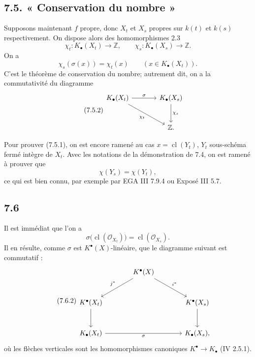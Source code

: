 \documentclass[11pt]{article}
\newcommand{\cl}{\operatorname{cl}}
\begin{document}
\subsection*{7.5. « Conservation du nombre »}
Supposons maintenant \(f\) propre, donc \(X_t\) et \(X_s\) propres sur \(k(t)\) et \(k(s)\) respectivement. On dispose alors des homomorphismes 2.3
\[
  \chi_t:K_\bullet(X_t)\longrightarrow \mathbb Z,\qquad
  \chi_s:K_\bullet(X_s)\longrightarrow \mathbb Z .
\]
On a
\begin{equation}\tag{7.5.1}
  \chi_s(\sigma(x))=\chi_t(x)\qquad (x\in K_\bullet(X_t)).
\end{equation}
C'est le théorème de conservation du nombre; autrement dit, on a la commutativité du diagramme
\begin{equation}\tag{7.5.2}
\begin{tikzcd}[column sep=large,row sep=large]
K_\bullet(X_t) \arrow[r,"\sigma"] \arrow[dr,"\chi_t"'] &
K_\bullet(X_s) \arrow[d,"\chi_s"]\\
& \mathbb Z .
\end{tikzcd}
\end{equation}

Pour prouver (7.5.1), on est encore ramené au cas \(x=\cl(Y_t)\), \(Y_t\) sous-schéma fermé intègre de \(X_t\). Avec les notations de la démonstration de 7.4, on est ramené à prouver que
\[
  \chi(Y_s)=\chi(Y_t),
\]
ce qui est bien connu, par exemple par EGA III 7.9.4 ou Exposé III 5.7.

\subsection*{7.6}
Il est immédiat que l'on a
\begin{equation}\tag{7.6.1}
  \sigma\bigl(\cl(\mathcal O_{X_t})\bigr)=\cl(\mathcal O_{X_s}).
\end{equation}
Il en résulte, comme \(\sigma\) est \(K^\bullet(X)\)-linéaire, que le diagramme suivant est commutatif :
\begin{equation}\tag{7.6.2}
\begin{tikzcd}[column sep=large,row sep=large]
& K^\bullet(X) \arrow[dl,"j^*"'] \arrow[dr,"i^*"] &\\
K^\bullet(X_t) \arrow[d] && K^\bullet(X_s) \arrow[d]\\
K_\bullet(X_t) \arrow[rr,"\sigma"'] && K_\bullet(X_s),
\end{tikzcd}
\end{equation}
où les flèches verticales sont les homomorphismes canoniques \(K^\bullet\to K_\bullet\) (IV 2.5.1).
\end{document}

